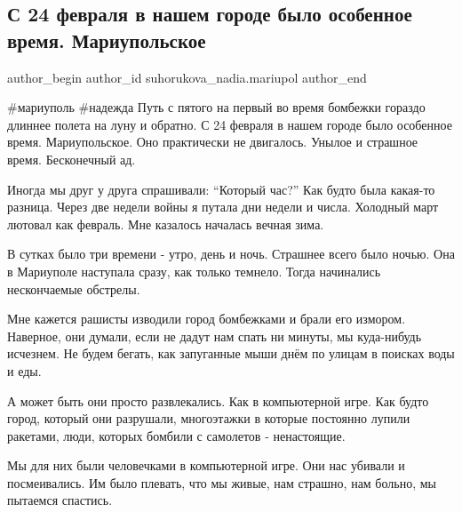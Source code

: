  
 
 
 
 
 
\subsection{С 24 февраля в нашем городе было особенное время. Мариупольское}
\label{sec:28_05_2022.fb.suhorukova_nadia.mariupol.1.vremja_gorod}
 
\ifcmt
 author_begin
   author_id suhorukova_nadia.mariupol
 author_end
\fi

\#мариуполь \#надежда Путь с пятого на первый во время бомбежки гораздо длиннее
полета на луну и обратно. С 24 февраля в нашем городе было особенное время.
Мариупольское. Оно практически не двигалось. Унылое и страшное время.
Бесконечный ад. 

Иногда мы друг у друга спрашивали:  \enquote{Который час?} Как будто была
какая-то разница. Через две недели войны я путала дни недели и числа. Холодный
март лютовал как февраль. Мне казалось началась вечная зима. 

В сутках было три времени  - утро, день и ночь. Страшнее всего было ночью. Она
в Мариуполе наступала сразу, как только темнело.  Тогда  начинались
нескончаемые  обстрелы. 

Мне кажется рашисты изводили город бомбежками и брали его измором. Наверное,
они думали,  если не дадут нам спать ни минуты, мы куда-нибудь исчезнем. Не
будем бегать, как запуганные мыши днём  по улицам в поисках воды и еды. 

А может быть они просто развлекались. Как в компьютерной игре. Как будто город,
который они разрушали, многоэтажки в которые постоянно лупили ракетами, люди,
которых бомбили с самолетов -  ненастоящие. 

Мы для них были человечками в компьютерной игре. Они нас убивали и
посмеивались.  Им было плевать, что мы живые, нам страшно, нам больно, мы
пытаемся спастись. 

